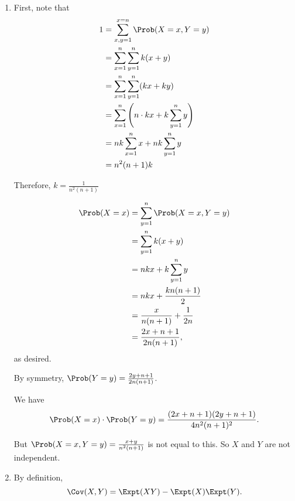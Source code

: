 \Question{\currfilebase}

\begin{enumerate}
    \item First, note that
          \begin{align*}
              1 & = \sum_{x, y = 1}^{x = n} \Prob(X = x, Y = y)                    \\
                & = \sum_{x = 1}^{n} \sum_{y = 1}^{n} k(x + y)                     \\
                & = \sum_{x = 1}^{n} \sum_{y = 1}^{n} (kx + ky)                    \\
                & = \sum_{x = 1}^{n} \left(n \cdot kx + k\sum_{y = 1}^{n} y\right) \\
                & = nk\sum_{x = 1}^{n} x + nk\sum_{y = 1}^{n} y                    \\
                & = n^2 (n+1) k
          \end{align*}

          Therefore, \(k = \frac{1}{n^2(n+1)}\)

          \begin{align*}
              \Prob(X = x) & = \sum_{y = 1}^{n} \Prob(X = x, Y = y) \\
                           & = \sum_{y = 1}^{n} k(x + y)            \\
                           & = nkx + k\sum_{y = 1}^{n} y            \\
                           & = nkx + \frac{kn(n+1)}{2}              \\
                           & = \frac{x}{n(n+1)} + \frac{1}{2n}      \\
                           & = \frac{2x + n+1}{2n(n+1)},
          \end{align*}
          as desired.

          By symmetry, \(\Prob(Y = y) = \frac{2y + n+1}{2n(n+1)}\).

          We have
          \[
              \Prob(X = x) \cdot \Prob(Y = y) = \frac{(2x+n+1)(2y+n+1)}{4n^2(n+1)^2}.
          \]

          But \(\Prob(X = x, Y = y) = \frac{x+y}{n^2(n+1)}\) is not equal to this. So \(X\) and \(Y\) are not independent.

    \item By definition,
          \[
              \Cov(X, Y) = \Expt(XY) - \Expt(X)\Expt(Y).
          \]


\end{enumerate}
